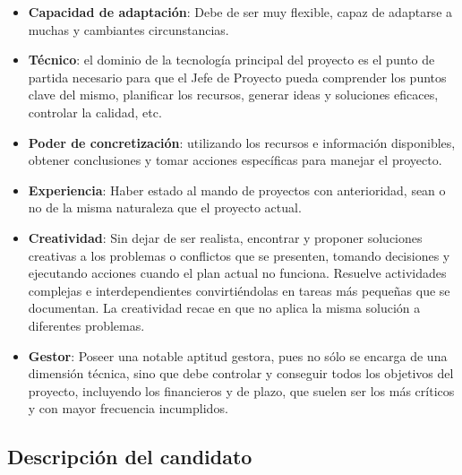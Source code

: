 \begin{itemize}
                \item \textbf{Capacidad de adaptación}:
                Debe de ser muy flexible, capaz de adaptarse a muchas y cambiantes circunstancias.
                
                \item \textbf{Técnico}:
                el dominio de la tecnología principal del proyecto es el punto de partida necesario para que el Jefe de Proyecto pueda comprender los puntos clave del mismo, planificar los recursos, generar ideas y soluciones eficaces, controlar la calidad, etc.
                                
                \item \textbf{Poder de concretización}:
                utilizando los recursos e información disponibles, obtener conclusiones y tomar acciones específicas para manejar el proyecto.
                                
                \item \textbf{Experiencia}:
                Haber estado al mando de proyectos con anterioridad, sean o no de la misma naturaleza que el proyecto actual.
                
                \item \textbf{Creatividad}:
                Sin dejar de ser realista, encontrar y proponer soluciones creativas a los problemas o conflictos que se presenten, tomando decisiones y ejecutando acciones cuando el plan actual no funciona.
                Resuelve actividades complejas e interdependientes convirtiéndolas en tareas más pequeñas que se documentan.
                La creatividad recae en que no aplica la misma solución a diferentes problemas.
                
                \item \textbf{Gestor}:
                Poseer una notable aptitud gestora, pues no sólo se encarga de una dimensión técnica, sino que debe controlar y conseguir todos los objetivos del proyecto, incluyendo los financieros y de plazo, que suelen ser los más críticos y con mayor frecuencia incumplidos.
			\end{itemize}


\subsection{Descripción del candidato}


